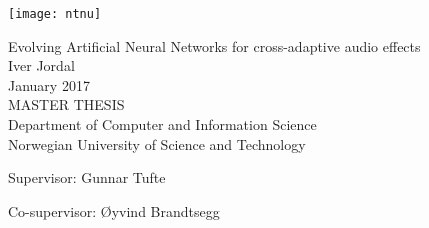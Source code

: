 
\thispagestyle{empty}
\texttt{[image: ntnu]}
\mbox{}\\[6pc]
\begin{center}
\Huge{Evolving Artificial Neural Networks for cross-adaptive audio effects}\\[2pc]

\Large{Iver Jordal}\\[1pc]
\large{January 2017}\\[2pc]

MASTER THESIS\\
Department of Computer and Information Science\\
Norwegian University of Science and Technology
\end{center}
\vfill

\noindent Supervisor: Gunnar Tufte

\noindent Co-supervisor: Øyvind Brandtsegg


